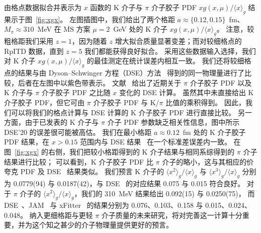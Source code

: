 由格点数据拟合并表示为 $x$ 函数的 K 介子与 $\pi$ 介子胶子 PDF $xg(x, \mu)/\langle x \rangle_g$ 结果示于图~\ref{fig:xgx}。
左图插图中，我们给出了两个格距 $a\approx\{0.12,0.15\}$~fm、$M_\pi\approx 310$~MeV 在 $\overline{\text{MS}}$ 方案 $\mu=2$~GeV 处的 K 介子 $xg(x, \mu)/\langle x \rangle_g$。
注意，较粗格距我们采用 $z=1$，因为随着 $z$ 增大拟合质量显著变差；而对较细格点的 RpITD 数据，直到 $z=5$ 我们都能获得良好拟合。
采用这些数据输入选择，我们对 K 介子 $xg(x, \mu)/\langle x \rangle_g$ 的最佳测定在统计误差内相互一致。
我们还将较细格点的结果与由 Dyson--Schwinger 方程（DSE）方法~\cite{Cui:2020tdf} 得到的同一物理量进行了比较，后者在左图中以紫色带表示。
%
文献~\cite{Cui:2020tdf} 给出了近期关于 $\pi$ 介子胶子 PDF 以及 K 介子与 $\pi$ 介子胶子 PDF 之比随 $x$ 变化的 DSE 计算。
虽然其中未直接给出 K 介子胶子 PDF，但它可由 $\pi$ 介子胶子 PDF 与 K/$\pi$ 比值的乘积得到。
因此，我们可以将我们的格点计算与 DSE 计算的 K 介子胶子 PDF 进行直接比较。
另一方面，由于已发表的 K 介子与 $\pi$ 介子 PDF 参数缺乏相关性信息，图中所示 DSE'20 的误差很可能被高估。
%
我们在最小格距 $a\approx 0.12$~fm 处的 K 介子胶子 PDF 结果，在 $x>0.15$ 范围内与 DSE 结果~\cite{Cui:2020tdf} 在一个标准差误差内一致。
在图~\ref{fig:xgx} 的右侧，我们把较小格距得到的 K 介子结果与相同系综得到的 $\pi$ 介子结果进行比较；
可以看到，K 介子胶子 PDF 比 $\pi$ 介子的略小，这与其相应的价夸克 PDF 及 DSE~\cite{Cui:2020tdf} 结果类似。
%
我们预言 K 介子的 $\langle x^2 \rangle_g/\langle x \rangle_g$ 与 $\langle x^3 \rangle_g/\langle x \rangle_g$ 分别为 0.0779(94) 与 0.0187(42)，与 DSE~\cite{Cui:2020tdf} 的对应结果 0.075 与 0.015 符合良好。
对于 $\pi$ 介子的 $\langle x^2 \rangle_g/\langle x \rangle_g$，我们的 310~MeV 结果给出
0.092(15) 与 0.0250(75)，
而 DSE~\cite{Cui:2020tdf}、JAM~\cite{Barry:2018ort,Cao:2021aci} 与 xFitter~\cite{Novikov:2020snp} 的结果分别为
0.076、0.103、0.158
与 0.015、0.024、0.048。
%
纳入更细格距与更轻 $\pi$ 介子质量的未来研究，将对完善这一计算十分重要，并为这个知之甚少的介子物理量提供更好的预言。
